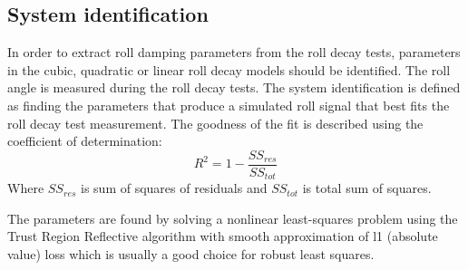 \subsection{System identification}
\label{se:system_identification}
In order to extract roll damping parameters from the roll decay tests, parameters in the cubic, quadratic or linear roll decay models should be identified. The roll angle is measured during the roll decay tests. The system identification is defined as finding the parameters that produce a simulated roll signal that best fits the roll decay test measurement. The goodness of the fit is described using the coefficient of determination:
\begin{equation} \label{eq:R2}
R^2=1-\frac{SS_{res}}{SS_{tot}}
\end{equation}
Where $SS_{res}$ is sum of squares of residuals and $SS_{tot}$ is total sum of squares.

The parameters are found by solving a nonlinear least-squares problem using the Trust Region Reflective algorithm with smooth approximation of l1 (absolute value) loss which is usually a good choice for robust least squares.